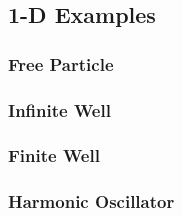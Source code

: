 \documentclass[11pt, letterpaper]{article}
\begin{document}
\begin{multicols*}{3}
\subsection{1-D Examples}
\subsubsection{Free Particle}
\subsubsection{Infinite Well}
\subsubsection{Finite Well}
\subsubsection{Harmonic Oscillator}
\end{multicols*}
\end{document}
